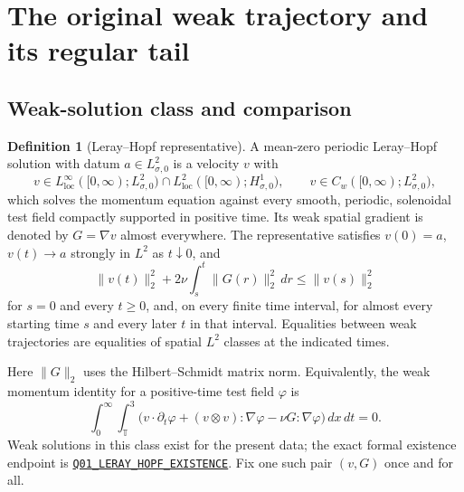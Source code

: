 \documentclass[11pt,a4paper]{article}
\numberwithin{equation}{section}
\theoremstyle{plain}
\theoremstyle{definition}
\newtheorem{definition}[theorem]{Definition}
\theoremstyle{remark}
\newcommand{\T}{\mathbb T^3}
\newcommand{\norm}[2]{\lVert #1\rVert_{#2}}
\newcommand{\decl}[1]{\begingroup\small\nolinkurl{#1}\endgroup}
\newcommand{\vanchor}[3]{\href{https://github.com/randogelist/Methboke/blob/fdb515d8bde35ec8021bbc26f360aca8dfa2855c/Material/_vendor/QuasiFeffermanB/#1\#L#2}{\decl{#3}}}
\begin{document}
\section{The original weak trajectory and its regular tail}\label{sec:tail}
\subsection{Weak-solution class and comparison}
\begin{definition}[Leray--Hopf representative]\label{def:LH}
A mean-zero periodic Leray--Hopf solution with datum $a\in L^2_{\sigma,0}$
is a velocity $v$ with
\[
 v\in L^\infty_{\mathrm{loc}}([0,\infty);L^2_{\sigma,0})
 \cap L^2_{\mathrm{loc}}([0,\infty);H^1_{\sigma,0}),
 \qquad v\in C_w([0,\infty);L^2_{\sigma,0}),
\]
which solves the momentum equation against every smooth, periodic,
solenoidal test field compactly supported in positive time. Its weak
spatial gradient is denoted by $G=\nabla v$ almost everywhere.
The representative satisfies $v(0)=a$, $v(t)\to a$ strongly in $L^2$
as $t\downarrow0$, and
\begin{equation}\label{eq:LHenergy}
 \norm{v(t)}{2}^2+2\nu\int_s^t\norm{G(r)}{2}^2\,dr
 \le\norm{v(s)}{2}^2
\end{equation}
for $s=0$ and every $t\ge0$, and, on every finite time interval, for
almost every starting time $s$ and every later $t$ in that interval.
Equalities between weak trajectories are equalities of spatial $L^2$
classes at the indicated times.
\end{definition}
Here $\norm{G}{2}$ uses the Hilbert--Schmidt matrix norm. Equivalently, the
weak momentum identity for a positive-time test field $\varphi$ is
\[
 \int_0^\infty\!\int_\T
 \bigl(v\cdot\partial_t\varphi+(v\otimes v):\nabla\varphi
       -\nu G:\nabla\varphi\bigr)\,dx\,dt=0.
\]
Weak solutions in this class exist for the present data; the exact
formal existence endpoint is
\vanchor{Endpoints/LerayHopfExistence.lean}{35}{Q01_LERAY_HOPF_EXISTENCE}.
Fix one such pair $(v,G)$ once and for all.
\end{document}
